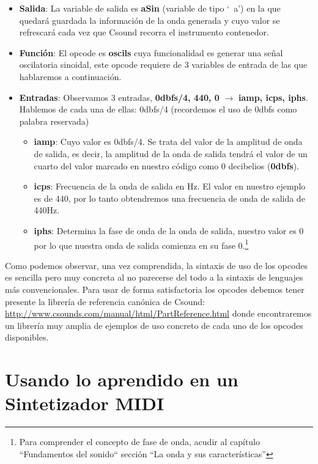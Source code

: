 \begin{itemize}
 \item \textbf{Salida}: La variable de salida es \textbf{aSin} (variable de tipo `\ a') en la que quedará guardada la información de la onda generada y cuyo valor se refrescará cada vez que Csound recorra el instrumento contenedor.
 
 \item \textbf{Función}: El opcode es \textbf{oscils} cuya funcionalidad es generar una señal oscilatoria sinoidal, este opcode requiere de 3 variables de entrada de las que hablaremos a continuación.
 
 \item \textbf{Entradas}: Observamos 3 entradas, \textbf{0dbfs/4, 440, 0} $\rightarrow$ \textbf{iamp, icps, iphs}. Hablemos  de cada una de ellas: 0dbfs/4 (recordemos el uso de 0dbfs como palabra reservada) 
 \begin{itemize}
 \item \textbf{iamp}: Cuyo valor es 0dbfs/4. Se trata del valor de la amplitud de onda de salida, es decir, la amplitud de la onda de salida tendrá el valor de un cuarto del valor marcado en nuestro código como 0 decibelios (\textbf{0dbfs}).
 
 \item \textbf{icps}: Frecuencia de la onda de salida en Hz. El valor en nuestro ejemplo es de 440, por lo tanto obtendremos una frecuencia de onda de salida de 440Hz.
 
 \item \textbf{iphs}: Determina la fase de onda de la onda de salida, nuestro valor es 0 por lo que nuestra onda de salida comienza en su fase 0.\footnote{Para comprender el concepto de fase de onda, acudir al capítulo ``Fundamentos del sonido`` sección ``La onda y sus características''}

 \end{itemize}

\end{itemize}

Como podemos observar, una vez comprendida, la sintaxis de uso de los opcodes es sencilla pero muy concreta al no parecerse del todo a la sintaxis de lenguajes más convencionales. Para usar de forma satisfactoria los opcodes debemos tener presente la librería de referencia canónica de Csound: \url{http://www.csounds.com/manual/html/PartReference.html} donde encontraremos un librería muy amplia de ejemplos de uso concreto de cada uno de los opcodes disponibles.

\section{Usando lo aprendido en un Sintetizador MIDI}\label{sec:usandoAprendido}

